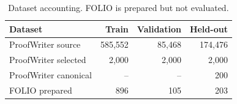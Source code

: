 \begin{table}[t]
\caption{Dataset accounting. FOLIO is prepared but not evaluated.}
\label{tab:datasets}
\centering
\small
\begin{tabular}{lrrr}
\toprule
Dataset & Train & Validation & Held-out \\
\midrule
ProofWriter source & 585,552 & 85,468 & 174,476 \\
ProofWriter selected & 2,000 & 2,000 & 2,000 \\
ProofWriter canonical & -- & -- & 200 \\
FOLIO prepared & 896 & 105 & 203 \\
\bottomrule
\end{tabular}
\end{table}
